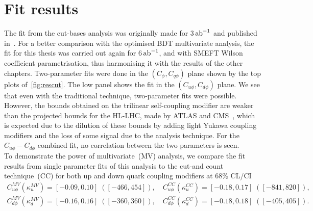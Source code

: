 \section{Fit results\label{sec:resultsly}}
The fit from the cut-bases analysis was originally made for 3$\,{\rm ab}^{-1}$ and published in~\cite{Alasfar:2019pmn}. For a better comparison with the optimised BDT multivariate analysis, the fit for this thesis was carried out again for 6$\,{\rm ab}^{-1}$, and with SMEFT Wilson coefficient parametrisation, thus harmonising it with the results of the other chapters. Two-parameter fits were done in the $(C_\phi,C_{q\phi})$ plane shown by the top plots of~\autoref{fig:rescut}. The low panel shows the fit in the $(C_{u\phi},C_{d\phi})$ plane.  We see that even with the traditional technique, two-parameter fits were possible. However, the bounds obtained on the trilinear self-coupling modifier are weaker than the projected bounds for the HL-LHC, made by ATLAS and CMS~\cite{ATL-PHYS-PUB-2018-053, ATLAS:2018rvj,CMS-PAS-FTR-18-011}, which is expected due to the dilution of these bounds by adding light Yukawa coupling modifiers and the loss of some signal due to the analysis technique. For the $C_{u\phi}-C_{d\phi}$ combined fit, no correlation between the two parameters is seen. \\ To demonstrate the power of multivariate~(MV) analysis, we compare the fit results from single parameter fits of this analysis to the cut-and count technique~(CC) for both up and down quark coupling modifiers at 68\% CL/CI 
\begin{eqnarray}
	C_{u\phi}^{MV} \left(\kappa_u^{MV}\right) = [-0.09, 0.10] \;([-466, 454]),\quad C_{u\phi}^{CC} (\kappa_u^{CC}) = [-0.18, 0.17] \;([-841, 820]), \nonumber\\
	C_{d\phi}^{MV} (\kappa_d^{MV}) = [-0.16, 0.16] \;([-360, 360]),\quad C_{d\phi}^{CC} (\kappa_d^{CC}) = [-0.18, 0.18] \;([-405, 405]). \nonumber\\
\end{eqnarray}
